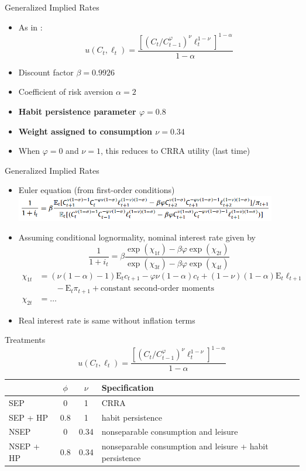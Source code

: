 \documentclass{beamer}
\def\E{\text{E}}
\begin{document}
\begin{frame}{Generalized Implied Rates}
\begin{itemize}
\item As in \cite{collard11}: $$u(C_t, \ell_t) = \frac{[(C_t/C_{t-1}^\varphi)^\nu \ell_t^{1-\nu}]^{1-\alpha}}{1-\alpha}$$
\item Discount factor $\beta = 0.9926$
\item Coefficient of risk aversion $\alpha = 2$
\item \textbf{Habit persistence parameter $\varphi = 0.8$}
\item \textbf{Weight assigned to consumption $\nu = 0.34$}
\item When $\varphi = 0$ and $\nu = 1$, this reduces to CRRA utility (last time)
\end{itemize}
\end{frame}

\begin{frame}{Generalized Implied Rates}
\begin{itemize}
\item Euler equation (from first-order conditions)
  \includegraphics[width=0.9\textwidth]{figs/euler-equation.png}
\item Assuming conditional lognormality, nominal interest rate given by
$$\frac{1}{1+i_t} = \beta \frac{\exp(\chi_{1t}) - \beta \varphi \exp(\chi_{2t})}{\exp(\chi_{3t}) - \beta \varphi \exp(\chi_{4t})}$$
\begin{align*}
\chi_{1t} &= (\nu(1-\alpha)-1) \E_t c_{t+1} - \varphi\nu(1-\alpha)c_t + (1-\nu)(1-\alpha) \E_t \ell_{t+1} \\
  &\qquad - \E_t \pi_{t+1} + \text{constant second-order moments} \\
\chi_{2t} &= \ldots
\end{align*}
\item Real interest rate is same without inflation terms
\end{itemize}
\end{frame}

\begin{frame}{Treatments}
$$u(C_t, \ell_t) = \frac{[(C_t/C_{t-1}^\varphi)^\nu \ell_t^{1-\nu}]^{1-\alpha}}{1-\alpha}$$
\bigskip
\begin{center}
\begin{tabular}{|l|c|c|p{}|} \hline
& $\phi$ & $\nu$ & Specification \\ \hline
SEP & 0 & 1 & CRRA \\
SEP + HP & 0.8 & 1 & habit persistence \\
NSEP & 0 & 0.34 & nonseparable consumption and leisure \\
NSEP + HP & 0.8 & 0.34 & nonseparable consumption and leisure + habit persistence \\ \hline
\end{tabular}
\end{center}
\end{frame}
\end{document}
